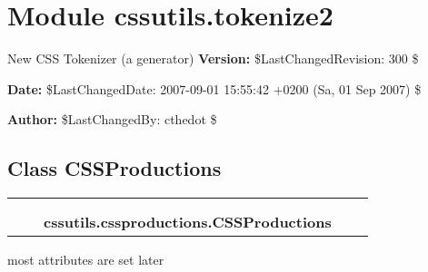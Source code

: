 %
%
%


\section{Module cssutils.tokenize2}

    \label{cssutils:tokenize2}

New CSS Tokenizer (a generator)
\textbf{Version:} \$LastChangedRevision: 300 \$



\textbf{Date:} \$LastChangedDate: 2007-09-01 15:55:42 +0200 (Sa, 01 Sep 2007) \$



\textbf{Author:} \$LastChangedBy: cthedot \$





\subsection{Class CSSProductions}

    \label{cssutils:cssproductions:CSSProductions}
\begin{tabular}{cccccc}
\multicolumn{2}{r}{\settowidth{\BCL}{object}\multirow{2}{\BCL}{object}}
&&
  \\\cline{3-3}
  &&\multicolumn{1}{c|}{}
&&
  \\
&&\multicolumn{2}{l}{\textbf{cssutils.cssproductions.CSSProductions}}
\end{tabular}


most attributes are set later


